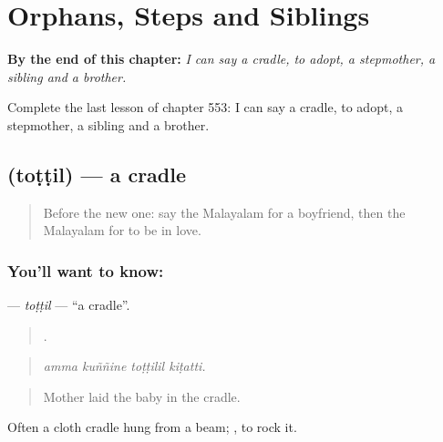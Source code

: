 
\chapter{Orphans, Steps and Siblings}
\label{ch:ml-orphans-steps-and-siblings}

\begin{chapteropening}
\textbf{By the end of this chapter:} \emph{I can say a cradle, to adopt, a stepmother, a sibling and a brother.}

Complete the last lesson of chapter 553: I can say a cradle, to adopt, a stepmother, a sibling and a brother.
\end{chapteropening}

\section[\texorpdfstring{\ml{തൊട്ടിൽ} (toṭṭil)}{തൊട്ടിൽ (toṭṭil)}]{ (toṭṭil) — a cradle}

\label{lesson:ML-C553-tottil}



\begin{quote}
Before the new one: say the Malayalam for a boyfriend, then the Malayalam for to be in love.
\end{quote}

\subsection*{You'll want to know: }
\textbf{} — \emph{toṭṭil} — \textquotedblleft{}a cradle\textquotedblright{}.

\begin{quote}
   .
\end{quote}

\begin{quote}
\emph{amma kuññine toṭṭilil kiṭatti.}
\end{quote}

\begin{quote}
Mother laid the baby in the cradle.
\end{quote}

Often a cloth cradle hung from a beam;  , to rock it.

